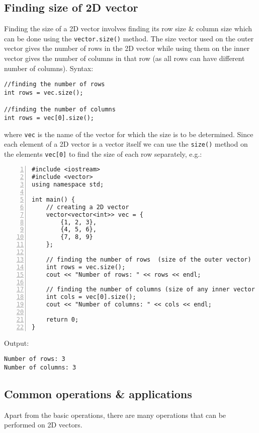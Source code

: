 \documentclass{article}
\begin{document}

\subsection{Finding size of 2D vector}
Finding the size of a 2D vector involves finding its row size \& column size which can be done using the {\tt vector.size()} method. The size vector used on the outer vector gives the number of rows in the 2D vector while using them on the inner vector gives the number of columns in that row (as all rows can have different number of columns). Syntax:
\begin{verbatim}
//finding the number of rows
int rows = vec.size();

//finding the number of columns
int rows = vec[0].size();
\end{verbatim}
where {\tt vec} is the name of the vector for which the size is to be determined. Since each element of a 2D vector is a vector itself we can use the {\tt size()} method on the elements {\tt vec[0]} to find the size of each row separately, e.g.:
\begin{Verbatim}[numbers=left,xleftmargin=5mm]
#include <iostream>
#include <vector>
using namespace std;

int main() {
    // creating a 2D vector
    vector<vector<int>> vec = {
        {1, 2, 3},
        {4, 5, 6},
        {7, 8, 9}
    };
	
    // finding the number of rows  (size of the outer vector)
    int rows = vec.size();
    cout << "Number of rows: " << rows << endl;
	
    // finding the number of columns (size of any inner vector first row)
    int cols = vec[0].size();
    cout << "Number of columns: " << cols << endl;
	
    return 0;
}
\end{Verbatim}
Output:
\begin{verbatim}
Number of rows: 3
Number of columns: 3
\end{verbatim}


\subsection{Common operations \& applications}
Apart from the basic operations, there are many operations that can be performed on 2D vectors.
\end{document}
